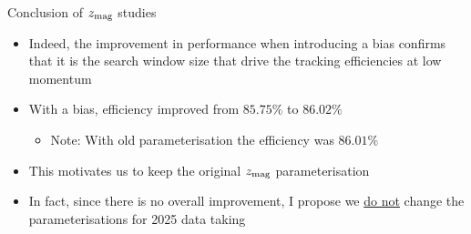 \documentclass[xcolor={dvipsnames}]{beamer}
\begin{document}
\begin{frame}{Conclusion of $z_{\rm mag}$ studies}
  \vspace{0.0cm}
  \begin{itemize}
    \setlength\itemsep{1.0em}
    \item{Indeed, the improvement in performance when introducing a bias confirms that it is the search window size that drive the tracking efficiencies at low momentum}
    \item{With a bias, efficiency improved from $85.75\%$ to $86.02\%$}
    \begin{itemize}
      \item{Note: With old parameterisation the efficiency was $86.01\%$}
    \end{itemize}
    \item{This motivates us to keep the original $z_{\rm mag}$ parameterisation}
    \item{In fact, since there is no overall improvement, I propose we \underline{do not} change the parameterisations for 2025 data taking}
  \end{itemize}
\end{frame}
\end{document}
